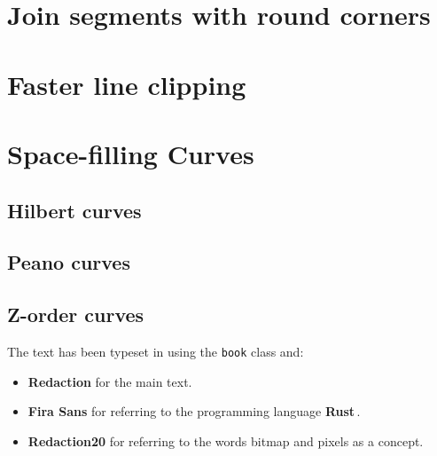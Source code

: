 \documentclass[12pt,a4,oneside,usenames,dvipsnames]{book}
\newcommand\bitmap{{\pixelfont{}bitmap}}
\newcommand\pixels{{\pixelfont{}pixels}}
\newcommand\Rust{{\fira{}\textbf{Rust}}}
\begin{document}
\chapter{Join segments with round corners}
\chapter{Faster line clipping}
\chapter{Space-filling Curves}
\section{Hilbert curves}
\section{Peano curves}
\section{Z-order curves}
\clearpage{}
\stopthumb
\backmatter
{}
\cleardoublepage
\printindex
\cleardoublepage
{}
\thispagestyle{empty}
\colophontitlesize{25pt}
\begin{colophon}
\noindent{}The text has been typeset in {\cm{}\XeLaTeX{}} using the \texttt{book} class and:
\begin{itemize}
  \item \textbf{Redaction} for the main text.
  \item \textbf{\fira{}Fira Sans} for referring to the programming language \Rust{}\,.
  \item \textbf{\pixelfont{}Redaction20} for referring to the words \bitmap{} and \pixels{} as a concept.
\end{itemize}
\end{colophon}
\clearpage{}
\listoftodos{}
\end{document}
